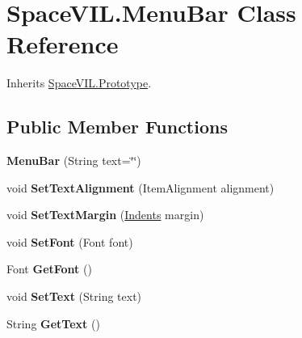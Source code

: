 \hypertarget{class_space_v_i_l_1_1_menu_bar}{}\section{Space\+V\+I\+L.\+Menu\+Bar Class Reference}
\label{class_space_v_i_l_1_1_menu_bar}


Inherits \mbox{\hyperlink{class_space_v_i_l_1_1_prototype}{Space\+V\+I\+L.\+Prototype}}.

\subsection*{Public Member Functions}
\begin{DoxyCompactItemize}
\item 
\mbox{\label{class_space_v_i_l_1_1_menu_bar_a77b62ef759f950393eaf0ea32c89560d}} 
{\bfseries Menu\+Bar} (String text=\char`\"{}\char`\"{})
\item 
\mbox{\label{class_space_v_i_l_1_1_menu_bar_a791da28290ce875327056617f42809e2}} 
void {\bfseries Set\+Text\+Alignment} (Item\+Alignment alignment)
\item 
\mbox{\label{class_space_v_i_l_1_1_menu_bar_ad9796582c454877458271fa8fcfd7749}} 
void {\bfseries Set\+Text\+Margin} (\mbox{\hyperlink{struct_space_v_i_l_1_1_decorations_1_1_indents}{Indents}} margin)
\item 
\mbox{\label{class_space_v_i_l_1_1_menu_bar_a24c4a1d6da17cf4f95ddef8bbbf23ea9}} 
void {\bfseries Set\+Font} (Font font)
\item 
\mbox{\label{class_space_v_i_l_1_1_menu_bar_adf1a93d0be57a1f3f2d3a35d8af0d7fc}} 
Font {\bfseries Get\+Font} ()
\item 
\mbox{\label{class_space_v_i_l_1_1_menu_bar_a7f93d9c7da5319a04052938e66090ee5}} 
void {\bfseries Set\+Text} (String text)
\item 
\mbox{\label{class_space_v_i_l_1_1_menu_bar_a8907f7d555de9a5cef78da6be2475238}} 
String {\bfseries Get\+Text} ()

\end{DoxyCompactItemize}
